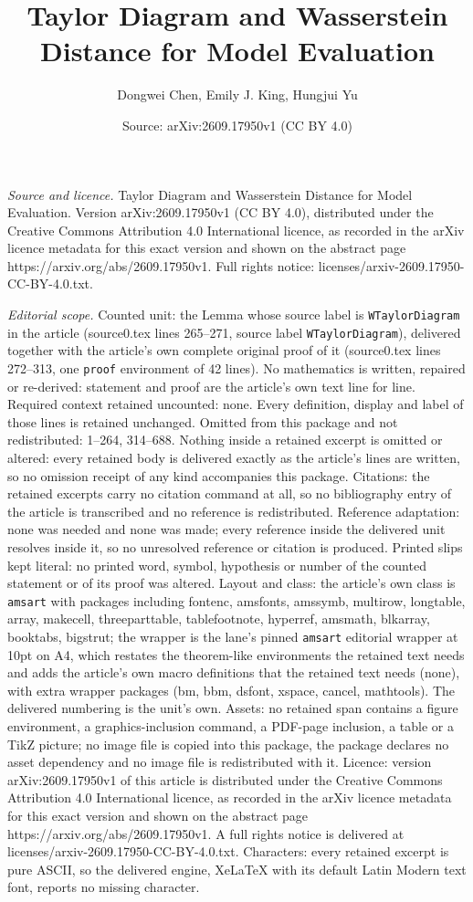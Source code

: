 \documentclass[10pt,a4paper]{amsart}
\title[Taylor Diagram and Wasserstein Distance for Model Evaluation]{Taylor Diagram and Wasserstein Distance for Model Evaluation}
\author{Dongwei Chen, Emily J. King, Hungjui Yu}
\date{Source: arXiv:2609.17950v1 (CC BY 4.0)}
\begin{document}
\maketitle

\noindent\emph{Source and licence.} Taylor Diagram and Wasserstein Distance for Model Evaluation. Version arXiv:2609.17950v1 (CC BY 4.0), distributed under the Creative Commons Attribution 4.0 International licence, as recorded in the arXiv licence metadata for this exact version and shown on the abstract page https://arxiv.org/abs/2609.17950v1. Full rights notice: licenses/arxiv-2609.17950-CC-BY-4.0.txt.\par\smallskip

\noindent\textit{Editorial scope.} Counted unit: the Lemma whose source label is \texttt{WTaylorDiagram} in the article (source0.tex lines 265--271, source label \texttt{WTaylorDiagram}), delivered together with the article's own complete original proof of it (source0.tex lines 272--313, one \texttt{proof} environment of 42 lines). No mathematics is written, repaired or re-derived: statement and proof are the article's own text line for line. Required context retained uncounted: none. Every definition, display and label of those lines is retained unchanged. Omitted from this package and not redistributed: 1--264, 314--688. Nothing inside a retained excerpt is omitted or altered: every retained body is delivered exactly as the article's lines are written, so no omission receipt of any kind accompanies this package. Citations: the retained excerpts carry no citation command at all, so no bibliography entry of the article is transcribed and no reference is redistributed. Reference adaptation: none was needed and none was made; every reference inside the delivered unit resolves inside it, so no unresolved reference or citation is produced. Printed slips kept literal: no printed word, symbol, hypothesis or number of the counted statement or of its proof was altered. Layout and class: the article's own class is \texttt{amsart} with packages including fontenc, amsfonts, amssymb, multirow, longtable, array, makecell, threeparttable, tablefootnote, hyperref, amsmath, blkarray, booktabs, bigstrut; the wrapper is the lane's pinned \texttt{amsart} editorial wrapper at 10pt on A4, which restates the theorem-like environments the retained text needs and adds the article's own macro definitions that the retained text needs (none), with extra wrapper packages (bm, bbm, dsfont, xspace, cancel, mathtools). The delivered numbering is the unit's own. Assets: no retained span contains a figure environment, a graphics-inclusion command, a PDF-page inclusion, a table or a TikZ picture; no image file is copied into this package, the package declares no asset dependency and no image file is redistributed with it. Licence: version arXiv:2609.17950v1 of this article is distributed under the Creative Commons Attribution 4.0 International licence, as recorded in the arXiv licence metadata for this exact version and shown on the abstract page https://arxiv.org/abs/2609.17950v1. A full rights notice is delivered at licenses/arxiv-2609.17950-CC-BY-4.0.txt. Characters: every retained excerpt is pure ASCII, so the delivered engine, XeLaTeX with its default Latin Modern text font, reports no missing character.
\end{document}
